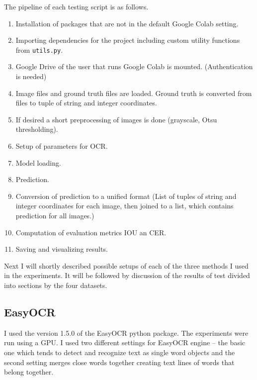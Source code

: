 The pipeline of each testing script is as follows.
\begin{enumerate}
    \item Installation of packages that are not in the default Google Colab setting.
    \item Importing dependencies for the project including custom utility functions from \texttt{utils.py}.
    \item Google Drive of the user that runs Google Colab is mounted. (Authentication is needed)
    \item Image files and ground truth files are loaded. Ground truth is converted from files to tuple of string and integer coordinates.
    \item If desired a short preprocessing of images is done (grayscale, Otsu thresholding).
    \item Setup of parameters for OCR.
    \item Model loading.
    \item Prediction.
    \item Conversion of prediction to a unified format (List of tuples of string and integer coordinates for each image, then joined to a list, which contains prediction for all images.)
    \item Computation of evaluation metrics IOU an CER.
    \item Saving and visualizing results.
\end{enumerate}

Next I will shortly described possible setups of each of the three methods I used in the experiments. It will be  followed by discussion of the results of test divided into sections by the four datasets.

\subsection*{EasyOCR}
I used the version 1.5.0 of the EasyOCR python package. The experiments were run using a GPU. I used two different settings for EasyOCR engine -- the basic one which tends to detect and recognize text as single word objects and the second setting merges close words together creating text lines of words that belong together.

